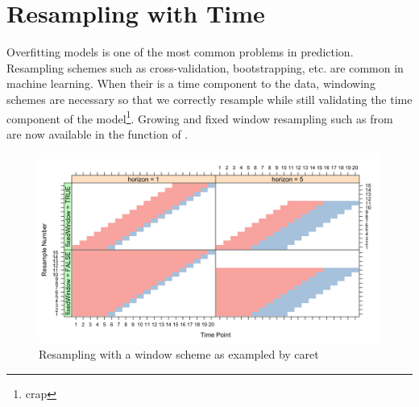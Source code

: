 \documentclass[article]{jss}\usepackage[]{graphicx}\usepackage[]{color}
\begin{document}
\section{Resampling with Time}

Overfitting models is one of the most common problems in prediction. Resampling schemes such as cross-validation, bootstrapping, etc. are common in machine learning. When their is a time component to the data, windowing schemes are necessary so that we correctly resample while still validating the time component of the model\footnote{crap}. Growing and fixed window resampling such as from ~\cite{hyndman2014forecasting} are now available in the  function of .

\begin{figure}[h]
\caption{Resampling with a window scheme as exampled by caret}
  \includegraphics{windowing_pic_caret}
  \centering
\end{figure}
\clearpage


\end{document}
